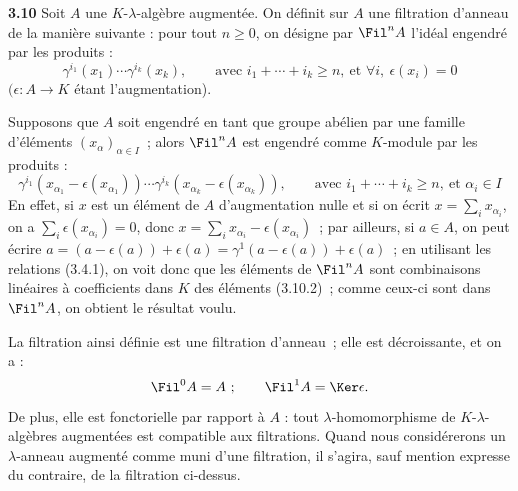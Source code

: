 \textbf{3.10}
Soit \(A\) une \(K\)-\(\lambda\)-algèbre augmentée. On définit sur \(A\) une filtration d'anneau de la manière suivante : pour tout \(n\ge0\), on désigne par \(\Fil^n A\) l'idéal engendré par les produits :
\begin{equation}\tag{3.10.1}
  \gamma^{i_1}(x_1)\cdots\gamma^{i_k}(x_k),
  \qquad \text{avec } i_1+\cdots+i_k\ge n,\ \text{et } \forall i,\ \epsilon(x_i)=0
\end{equation}
\((\epsilon:A\to K\) étant l'augmentation).

Supposons que \(A\) soit engendré en tant que groupe abélien par une famille d'éléments \((x_\alpha)_{\alpha\in I}\)~; alors \(\Fil^n A\) est engendré comme \(K\)-module par les produits :
\begin{equation}\tag{3.10.2}
  \gamma^{i_1}(x_{\alpha_1}-\epsilon(x_{\alpha_1}))\cdots
  \gamma^{i_k}(x_{\alpha_k}-\epsilon(x_{\alpha_k})),
  \qquad \text{avec } i_1+\cdots+i_k\ge n,\ \text{et } \alpha_i\in I
\end{equation}
En effet, si \(x\) est un élément de \(A\) d'augmentation nulle et si on écrit \(x=\sum_i x_{\alpha_i}\), on a \(\sum_i \epsilon(x_{\alpha_i})=0\), donc \(x=\sum_i x_{\alpha_i}-\epsilon(x_{\alpha_i})\)~; par ailleurs, si \(a\in A\), on peut écrire \(a=(a-\epsilon(a))+\epsilon(a)=\gamma^1(a-\epsilon(a))+\epsilon(a)\)~; en utilisant les relations (3.4.1), on voit donc que les éléments de \(\Fil^n A\) sont combinaisons linéaires à coefficients dans \(K\) des éléments (3.10.2)~; comme ceux-ci sont dans \(\Fil^n A\), on obtient le résultat voulu.

La filtration ainsi définie est une filtration d'anneau~; elle est décroissante, et on a :
\[
  \Fil^0A=A~;
  \qquad \Fil^1A=\Ker\epsilon.
\]
De plus, elle est fonctorielle par rapport à \(A\) : tout \(\lambda\)-homomorphisme de \(K\)-\(\lambda\)-algèbres augmentées est compatible aux filtrations. Quand nous considérerons un \(\lambda\)-anneau augmenté comme muni d'une filtration, il s'agira, sauf mention expresse du contraire, de la filtration ci-dessus.

